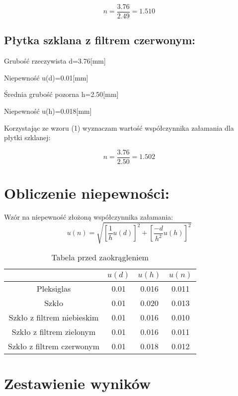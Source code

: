 \documentclass{article}
\begin{document}
	\[
	    n=\frac{3.76}{2.49}=1.510
	\]
	
	\subsection{Płytka szklana z filtrem czerwonym:}
	Grubość rzeczywista d=3.76[mm]
	
	\noindent Niepewność u(d)=0.01[mm]
	
	\noindent Średnia grubość pozorna h=2.50[mm]
	
	\noindent Niepewność u(h)=0.018[mm]
	
	\noindent Korzystając ze wzoru (1) wyznaczam wartość współczynnika załamania dla płytki szklanej:
	
	\[
	    n=\frac{3.76}{2.50}=1.502
	\]
	
	\section{Obliczenie niepewności:}
	
	Wzór na niepewność złożoną współczynnika załamania:
	\begin{equation}
	    u(n)=\sqrt{\left[\frac{1}{h}u(d)\right]^{2}+\left[\frac{-d}{h^{2}}u(h)\right]^{2}}
	\end{equation}

	\begin{table}[!htb]
	\centering
    \begin{tabular}{|c|c|c|c|}
    \hline
     & $u(d)$ & $u(h)$ & $u(n)$ \\ \hline
     Pleksiglas                 & 0.01 & 0.016 & 0.011\\ \hline
     Szkło                      & 0.01 & 0.020 & 0.013 \\ \hline
     Szkło z filtrem niebieskim & 0.01 & 0.016 & 0.010 \\ \hline
     Szkło z filtrem zielonym   & 0.01 & 0.016 & 0.011 \\ \hline
     Szkło z filtrem czerwonym  & 0.01 & 0.018 & 0.012 \\ \hline

    \end{tabular}
        \caption{Tabela przed zaokrągleniem}
    \end{table}

    \section{Zestawienie wyników}
    
\end{document}
